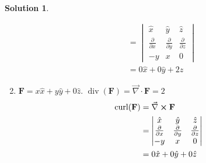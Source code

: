 \documentclass[10pt]{article}
\theoremstyle{definition}
\newtheorem{soln}{Solution}
\newcommand{\ux}{\hat{x}}
\newcommand{\uy}{\hat{y}}
\newcommand{\uz}{\hat{z}}
\DeclareMathOperator{\Div}{div}
\DeclareMathOperator{\Curl}{curl}
\begin{document}
\begin{soln}
\begin{enumerate}[label=(\alph*)]
\begin{align*}
                              & =\begin{vmatrix}
                                   \ux                         & \uy                         & \uz                         \\
                                   \frac{\partial}{\partial x} & \frac{\partial}{\partial y} & \frac{\partial}{\partial z} \\
                                   -y                          & x                           & 0
                                 \end{vmatrix} \\
                              & = 0\ux + 0\uy +2\uz
          \end{align*}
    \item $\mathbf{F}=x\ux+y\uy+0\uz$. $\Div(\mathbf{F})=\vec{\nabla} \cdot \mathbf{F}=2$
          \begin{align*}
            \Curl(\mathbf{F}) & =\vec{\nabla} \cross \mathbf{F}                                                          \\
                              & =\begin{vmatrix}
                                   \ux                         & \uy                         & \uz                         \\
                                   \frac{\partial}{\partial x} & \frac{\partial}{\partial y} & \frac{\partial}{\partial z} \\
                                   -y                          & x                           & 0
                                 \end{vmatrix} \\
                              & = 0\ux + 0\uy +0\uz
          \end{align*}
  \end{enumerate}
\end{soln}
\newpage
\end{document}
